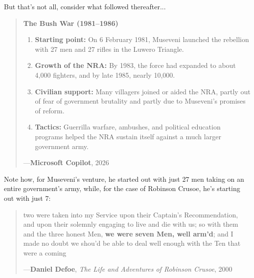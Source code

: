 \documentclass[a4paper]{article}
\begin{document}
But that's not all, consider what followed thereafter...


\noindent
\begin{minipage}{1\textwidth}
\vspace{1em}
\begin{quotation}
{\ttfamily


\textbf{The Bush War (1981--1986)}
\begin{enumerate}
  \item \textbf{Starting point:} On 6 February 1981, Museveni launched the rebellion with 27 men and 27 rifles in the Luwero Triangle.
  \item \textbf{Growth of the NRA:} By 1983, the force had expanded to about 4,000 fighters, and by late 1985, nearly 10,000.
  \item \textbf{Civilian support:} Many villagers joined or aided the NRA, partly out of fear of government brutality and partly due to Museveni’s promises of reform.
  \item \textbf{Tactics:} Guerrilla warfare, ambushes, and political education programs helped the NRA sustain itself against a much larger government army.
\end{enumerate}


}
\hspace*{\fill} ---\textbf{Microsoft Copilot}, 2026\cite{copilot_assistant}
\end{quotation}
\vspace{1em}
\end{minipage}


Note how, for Museveni's venture, he started out with just 27 men taking on an entire government's army, while, for the case of Robinson Crusoe, he's starting out with just 7:



\noindent
\begin{minipage}{1\textwidth}
\vspace{1em}
\begin{quotation}
{\ttfamily


two were taken into my Service upon their Captain’s Recommendation, and upon their solemnly engaging to live and die with us; so with them and the three honest Men, \textbf{we were seven Men, well arm’d}; and I made no doubt we shou’d be able to deal well enough with the Ten that were a coming


}
\hspace*{\fill} ---\textbf{Daniel Defoe}, \textit{The Life and Adventures of Robinson Crusoe}, 2000\cite{Defoe2007}
\end{quotation}
\vspace{1em}
\end{minipage}
\end{document}
